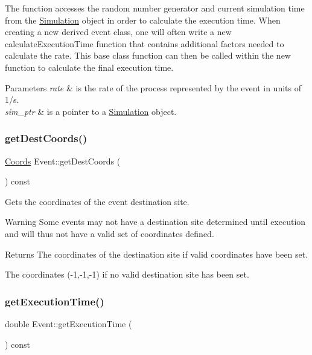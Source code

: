 The function accesses the random number generator and current simulation time from the \hyperlink{class_simulation}{Simulation} object in order to calculate the execution time. When creating a new derived event class, one will often write a new calculate\+Execution\+Time function that contains additional factors needed to calculate the rate. This base class function can then be called within the new function to calculate the final execution time. 
\begin{DoxyParams}{Parameters}
{\em rate} & is the rate of the process represented by the event in units of 1/s. \\
\hline
{\em sim\+\_\+ptr} & is a pointer to a \hyperlink{class_simulation}{Simulation} object. \\
\hline
\end{DoxyParams}
\mbox{\label{class_event_a6b4287971afaca8211f91f361ef55997}} 
\subsubsection{\texorpdfstring{get\+Dest\+Coords()}{getDestCoords()}}
{\footnotesize\ttfamily \hyperlink{struct_coords}{Coords} Event\+::get\+Dest\+Coords (\begin{DoxyParamCaption}{ }\end{DoxyParamCaption}) const}



Gets the coordinates of the event destination site. 

\begin{DoxyWarning}{Warning}
Some events may not have a destination site determined until execution and will thus not have a valid set of coordinates defined. 
\end{DoxyWarning}
\begin{DoxyReturn}{Returns}
The coordinates of the destination site if valid coordinates have been set. 

The coordinates (-\/1,-\/1,-\/1) if no valid destination site has been set. 
\end{DoxyReturn}
\mbox{\label{class_event_a65550d982cdf85d993658cd7070c960c}} 
\subsubsection{\texorpdfstring{get\+Execution\+Time()}{getExecutionTime()}}
{\footnotesize\ttfamily double Event\+::get\+Execution\+Time (\begin{DoxyParamCaption}{ }\end{DoxyParamCaption}) const}



